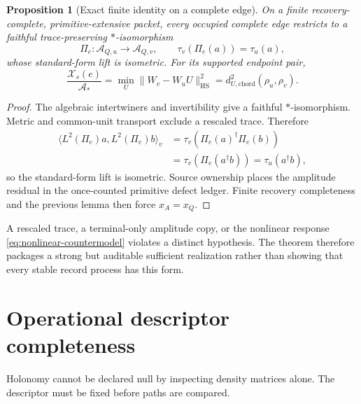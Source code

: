 \documentclass[11pt]{article}
\newtheorem{proposition}{Proposition}
\newcommand{\Astar}{\mathcal A_*}
\newcommand{\HS}{\mathrm{HS}}
\begin{document}
\begin{proposition}[Exact finite identity on a complete edge]
On a finite recovery-complete, primitive-extensive packet, every occupied
complete edge restricts to a faithful trace-preserving \(*\)-isomorphism
\begin{equation}
 \Pi_e:\mathcal A_{Q,u}\to\mathcal A_{Q,v},\qquad
 \tau_v(\Pi_e(a))=\tau_u(a),
 \label{eq:trace-preserving-isomorphism}
\end{equation}
whose standard-form lift is isometric.  For its supported endpoint pair,
\begin{equation}
 \boxed{\frac{\mathcal X_s(e)}{\Astar}
 =\min_U\lVert W_v-W_uU\rVert_{\HS}^2
 =d_{U,\mathrm{chord}}^2(\rho_u,\rho_v).}
 \label{eq:complete-edge-a8b}
\end{equation}
\end{proposition}
\begin{proof}
The algebraic intertwiners and invertibility give a faithful
\(*\)-isomorphism.  Metric and common-unit transport exclude a rescaled trace.
Therefore
\begin{align}
 \langle L^2(\Pi_e)a,L^2(\Pi_e)b\rangle_v
 &=\tau_v\!\left(\Pi_e(a)^\dagger\Pi_e(b)\right)\\
 &=\tau_v\!\left(\Pi_e(a^\dagger b)\right)
 =\tau_u(a^\dagger b),
\end{align}
so the standard-form lift is isometric.  Source ownership places the
amplitude residual in the once-counted primitive defect ledger.  Finite
recovery completeness and the previous lemma then force \(x_A=x_Q\).
\end{proof}

A rescaled trace, a terminal-only amplitude copy, or the nonlinear response
\eqref{eq:nonlinear-countermodel} violates a distinct hypothesis.  The theorem
therefore packages a strong but auditable sufficient realization rather than
showing that every stable record process has this form.

\section{Operational descriptor completeness}

Holonomy cannot be declared null by inspecting density matrices alone.  The
descriptor must be fixed before paths are compared.
\end{document}
